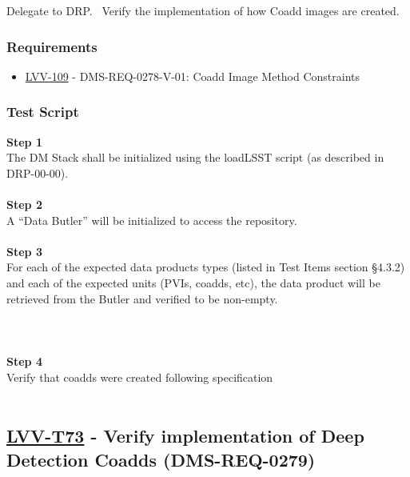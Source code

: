 Delegate to DRP. ~Verify the implementation of how Coadd images are
created.

\hypertarget{requirements-49}{%
\subsubsection{Requirements}\label{requirements-49}}

\begin{itemize}
\tightlist
\item
  \href{https://jira.lsstcorp.org/browse/LVV-109}{LVV-109} -
  DMS-REQ-0278-V-01: Coadd Image Method Constraints
\end{itemize}

\hypertarget{test-script-49}{%
\subsubsection{Test Script}\label{test-script-49}}

\textbf{Step 1}\\
The DM Stack shall be initialized using the loadLSST script (as
described in DRP-00-00).\\
~\\
\textbf{Step 2}\\
A ``Data Butler'' will be initialized to access the repository.\\
~\\
\textbf{Step 3}\\
For each of the expected data products types (listed in Test Items
section §4.3.2) and each of the expected units (PVIs, coadds, etc), the
data product will be retrieved from the Butler and verified to be
non-empty.\\
~\\
~\\
~\\
\textbf{Step 4}\\
Verify that coadds were created following specification\\
~\\

\hypertarget{lvv-t73---verify-implementation-of-deep-detection-coadds-dms-req-0279}{%
\subsection{\texorpdfstring{\href{https://jira.lsstcorp.org/secure/Tests.jspa\#/testCase/LVV-T73}{LVV-T73}
- Verify implementation of Deep Detection Coadds
(DMS-REQ-0279)}{LVV-T73 - Verify implementation of Deep Detection Coadds (DMS-REQ-0279)}}\label{lvv-t73---verify-implementation-of-deep-detection-coadds-dms-req-0279}}

